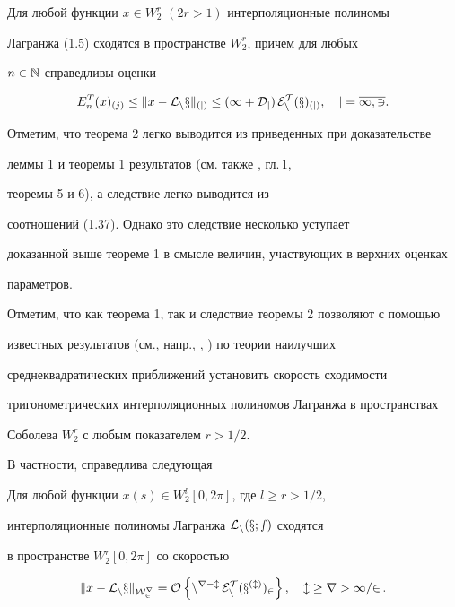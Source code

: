 \begin{cornonum} 


Для любой функции $x\in W_2^r $ $(2r>1)$ интерполяционные полиномы


Лагранжа (1.5) сходятся в пространстве $W_2^r$, причем для любых


$n\in \Bbb{N}$ справедливы оценки


\begin{equation}


E_n^T(x)_{(j)}\le \|x-\cal{L}_nx\|_{(j)}\le


(1+D_j)\, E_n^T(x)_{(j)},\quad j=\overline{1,3}.


\end{equation}


\end{cornonum}





Отметим, что теорема 2 легко выводится из приведенных при доказательстве


леммы 1 и теоремы 1 результатов (см. также \cite{Erm}, гл.\,1,


теоремы 5 и 6), а следствие легко выводится из


соотношений (1.37). Однако это следствие несколько уступает


доказанной выше теореме 1 в смысле величин, участвующих в верхних оценках


параметров.





Отметим, что как теорема 1, так и следствие теоремы 2 позволяют с помощью


известных результатов (см., напр., \cite{Ahi}, \cite{Tim}) по теории наилучших


среднеквадратических приближений установить скорость сходимости


тригонометрических интерполяционных полиномов Лагранжа в пространствах


Соболева $W_2^r$ с любым показателем $r>1/2$.


В частности, справедлива следующая





\begin{thm}


Для любой функции $x(s)\in W_2^l[0,2\pi ]$, где $l\ge r>1/2$,


интерполяционные полиномы Лагранжа $\cal{L}_n(x;s)$ сходятся


в пространстве $W_2^r[0,2\pi ]$ со скоростью


\begin{equation}


\|x- \cal{L}_nx\|_{W_2^r} =O\, \Bigl\{ n^{r-l}\,


E_n^T(x^{(l)})_2 \Bigr\} \, ,\quad l\ge r>1/2\, .


\end{equation}


\end{thm}





